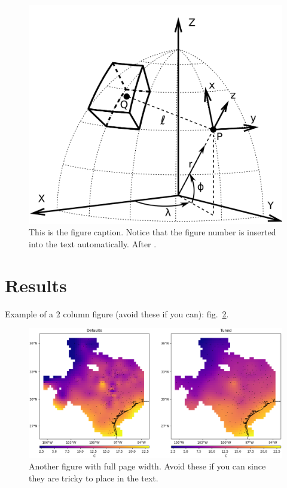 \documentclass[9pt,twocolumn]{paper}
\begin{document}
\begin{figure}[!htb]
  \includegraphics[width=\columnwidth]{figures/tesseroid-coord-sys.png}
  \caption{
    This is the figure caption. Notice that the figure number is inserted into
    the text automatically. After \citet{uieda2015}.
  }
  \label{fig:example}
\end{figure}

\lipsum[2-4]


\section{Results}

Example of a 2 column figure (avoid these if you can):
fig.~\ref{fig:example_fullpage}.
\lipsum[4]

\begin{figure}[!htb]
  \includegraphics[width=\textwidth]{figures/example-spline-interpolation.png}
  \caption{
    Another figure with full page width. Avoid these if you can since they are
    tricky to place in the text.
  }
  \label{fig:example_fullpage}
\end{figure}
\end{document}
